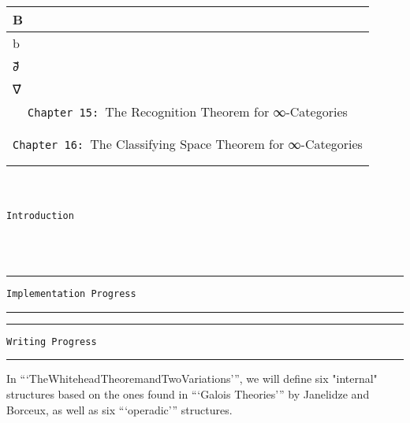 \documentclass{book}
\theoremstyle{definition}
\renewcommand{\chapter}[1]{
\newpage
{
\Huge 
\begin{center}
\ \\
\ \\
\thispagestyle{empty}
\texttt{#1}
\end{center}}
\ \\
\ \\
}
\begin{document}
{\begin{longtable}{|| l || l ||}
B⃗ & \\
\hline
b⃗ & \\
 \hline
∂⃗ & \\
\hline
∇⃗ & \\
\hline \hline
\multicolumn{2}{||c||}{\texttt{Chapter 15: }The Recognition Theorem for ∞-Categories} \\
\hline \hline
 & \\
\hline
 & \\
\hline \hline
\multicolumn{2}{||c||}{\texttt{Chapter 16: }The Classifying Space Theorem for ∞-Categories} \\
\hline \hline
 & \\
\hline
 & \\
\hline \hline
\end{longtable}
}

\chapter{Introduction}

\noindent\textcolor{Red}{\rule{16cm}{1mm}}
\begin{center}
\texttt{Implementation Progress}
\end{center}
\noindent\textcolor{Red}{\rule{16cm}{1mm}}

\noindent\textcolor{Red}{\rule{16cm}{1mm}}
\begin{center}
\texttt{Writing Progress}
\end{center}
\noindent\textcolor{Red}{\rule{16cm}{1mm}}

In ```TheWhiteheadTheoremandTwoVariations''', we will define six "internal" structures based on the ones found in ```Galois Theories''' by Janelidze and Borceux, as well as six ```operadic''' structures.

\iffalse
Ω⃗, Ω⃡, Ω⃗₀, Ω⃡₀ are the ones I construct and Ω Mathlib's.
\fi
\end{document}
